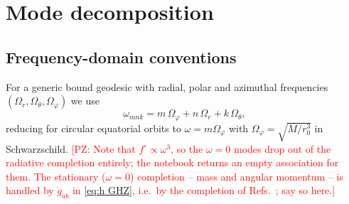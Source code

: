 \documentclass[preprint,aps,nofootinbib,a4paper,superscriptaddress,longbibliography,amsfonts, amssymb,amsmath,titlepage]{revtex4-1}
\numberwithin{equation}{section} %
\newcommand{\PZ}[1]{\textcolor{red}{\textsf{[PZ: #1]}}}
\newcommand{\emm}{m}
\def\fHo{f^{\circ}}
\def\wmnk{\omega_{\emm n k}}
\begin{document}
\section{Mode decomposition}
\label{sec:modes}

\subsection{Frequency-domain conventions}
\label{sec:freq}
For a generic bound geodesic with radial, polar and azimuthal frequencies
$(\Omega_{r},\Omega_{\theta},\Omega_{\varphi})$ we use
\begin{equation}\label{eq:omega mnk}
\wmnk = \emm\,\Omega_{\varphi}+n\,\Omega_{r}+k\,\Omega_{\theta},
\end{equation}
reducing for circular equatorial orbits to $\omega = \emm\Omega_{\varphi}$
with $\Omega_{\varphi}=\sqrt{M/r_{0}^{3}}$ in Schwarzschild.
\PZ{Note that $\fHo\propto\omega^{3}$, so the $\omega=0$ modes drop out of the
radiative completion entirely; the notebook returns an empty association for
them.  The stationary ($\omega=0$) completion -- mass and angular momentum --
is handled by $\dot g_{ab}$ in \eqref{eq:h GHZ}, i.e.\ by the completion of
Refs.~\cite{Merlin:2016boc,vandeMeent:2017fqk}; say so here.}
\end{document}
